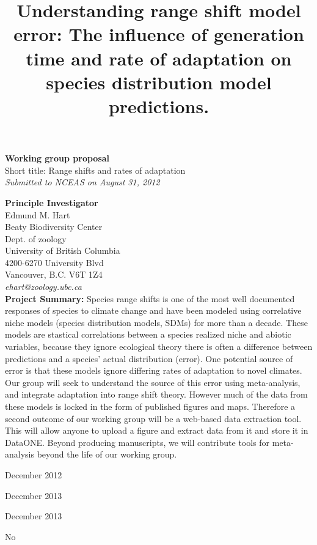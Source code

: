 \documentclass[pdftex,11pt,a4paper]{article}\usepackage{graphicx, color}
\begin{document}
\title{Understanding range shift model error: The influence of generation time and rate of adaptation on species distribution model predictions.}
 \date{}
\maketitle

{\bf  Working group proposal \\}
Short title: Range shifts and rates of adaptation \\
{\it Submitted to NCEAS on August 31, 2012\\}

{\bf Principle Investigator\\}
Edmund M. Hart\\
Beaty Biodiversity Center\\
Dept. of zoology\\
University of British Columbia\\
4200-6270 University Blvd\\
Vancouver, B.C. V6T 1Z4\\
{\it ehart@zoology.ubc.ca}\\ 



{\bf Project Summary:} Species range shifts is one of the most well documented responses of species to climate change and have been modeled using correlative niche models (species distribution models, SDMs) for more than a decade.  These models are stastical correlations between a species realized niche and abiotic variables, because they ignore ecological theory there is often a difference between predictions and a species' actual distribution (error). One potential source of error is that these models ignore differing rates of adaptation to novel climates.  Our group will seek to understand the source of this error using meta-analysis, and integrate adaptation into range shift theory. However much of the data from these models is locked in the form of published figures and maps. Therefore a second outcome of our working group will be a web-based data extraction tool. This will allow anyone to upload a figure and extract data from it and store it in DataONE.  Beyond producing manuscripts, we will contribute tools for meta-analysis beyond the life of our working group.
\\
\begin{description}\itemsep1pt
\item[Start date] December 2012
\item[End date] December 2013
\item[Data release] December 2013
\item[Resubmission?] No
\end{description}
\end{document}
